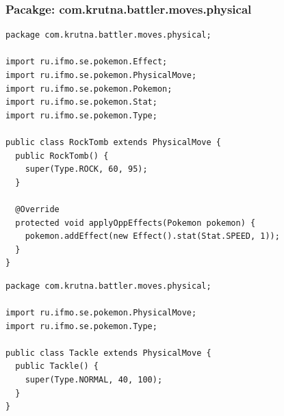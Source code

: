 \documentclass[11pt]{article}
\begin{document}
\subsubsection{Pacakge: com.krutna.battler.moves.physical}
\label{sec:org7fcecfb}
\begin{lstlisting}
package com.krutna.battler.moves.physical;

import ru.ifmo.se.pokemon.Effect;
import ru.ifmo.se.pokemon.PhysicalMove;
import ru.ifmo.se.pokemon.Pokemon;
import ru.ifmo.se.pokemon.Stat;
import ru.ifmo.se.pokemon.Type;

public class RockTomb extends PhysicalMove {
  public RockTomb() {
    super(Type.ROCK, 60, 95);
  }

  @Override
  protected void applyOppEffects(Pokemon pokemon) {
    pokemon.addEffect(new Effect().stat(Stat.SPEED, 1));
  }
}
\end{lstlisting}
\begin{lstlisting}
package com.krutna.battler.moves.physical;

import ru.ifmo.se.pokemon.PhysicalMove;
import ru.ifmo.se.pokemon.Type;

public class Tackle extends PhysicalMove {
  public Tackle() {
    super(Type.NORMAL, 40, 100);
  }
}
\end{lstlisting}
\end{document}
